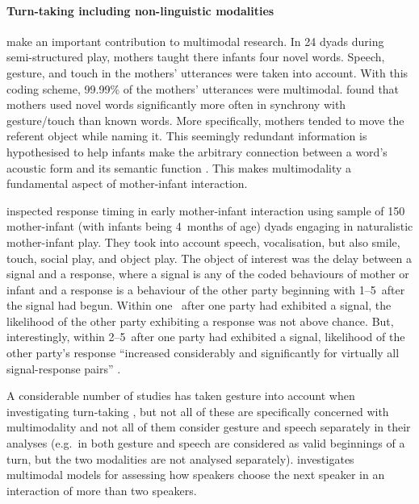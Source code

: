 \paragraph{Turn-taking including non-linguistic modalities}
\citet{gogate_study_2000} make an important contribution to multimodal research.
In 24 dyads during semi-structured play, mothers taught there infants four novel words.
Speech, gesture, and touch in the mothers' utterances were taken into account.
With this coding scheme, 99.99\% of the mothers' utterances were multimodal.
\citet{gogate_study_2000} found that mothers used novel words significantly more often in synchrony with gesture/touch than known words.
More specifically, mothers tended to move the referent object while naming it.
This seemingly redundant information is hypothesised to help infants make the arbitrary connection between a word's acoustic form and its semantic function \citep[]{gogate_study_2000}.
This makes multimodality a fundamental aspect of mother-infant interaction.

\citet{vanegeren_mother-infant_2001} inspected response timing in early mother-infant interaction using sample of 150 mother-infant (with infants being 4~months of age) dyads engaging in naturalistic mother-infant play.
They took into account speech, vocalisation, but also smile, touch, social play, and object play.
The object of interest was the delay between a signal and a response, where a signal is any of the coded behaviours of mother or infant and a response is a behaviour of the other party beginning with 1--5\s\ after the signal had begun.
Within one \sone\ after one party had exhibited a signal, the likelihood of the other party exhibiting a response was not above chance.
But, interestingly, within 2--5\s\ after one party had exhibited a signal, likelihood of the other party's response ``increased considerably and significantly for virtually all signal-response pairs'' \citep[]{vanegeren_mother-infant_2001}.

A considerable number of studies has taken gesture into account when investigating turn-taking \citep[among others]{benus_pragmatic_2011,mccowan_automatic_2005,schmitt_zur_2005,stivers_universals_2009}, but not all of these are specifically concerned with multimodality and not all of them consider gesture and speech separately in their analyses (e.g.~in \citet{stivers_universals_2009} both gesture and speech are considered as valid beginnings of a turn, but the two modalities are not analysed separately).
\citet{mondada_participants_2006,mondada_multimodal_2007} investigates multimodal models for assessing how speakers choose the next speaker in an interaction of more than two speakers.

